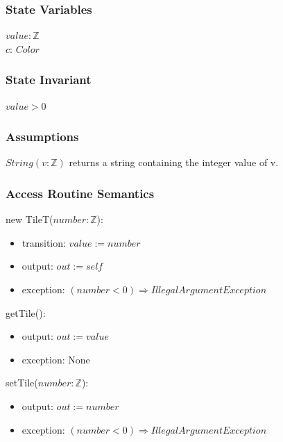 \documentclass[12pt]{article}
\begin{document}
\subsubsection* {State Variables}

$\mathit{value}: \mathbb{Z}$\\
$\mathit{c}$: $Color$

\subsubsection* {State Invariant}

$value > 0$

\subsubsection* {Assumptions}

$String(v: \mathbb{Z})$ returns a string containing the integer value of v.

\subsubsection* {Access Routine Semantics}

\noindent new TileT($number: \mathbb{Z}$):
\begin{itemize}
  \item transition: $value := number$
  \item output: $out := \mathit{self}$
  \item exception: $(number < 0) \Rightarrow IllegalArgumentException$
\end{itemize}

\noindent getTile():
\begin{itemize}
  \item output: $out := value$
  \item exception: None
\end{itemize}

\noindent setTile($number: \mathbb{Z}$):
\begin{itemize}
  \item output: $out := number$
  \item exception: $(number < 0) \Rightarrow IllegalArgumentException$
\end{itemize}
\end{document}
